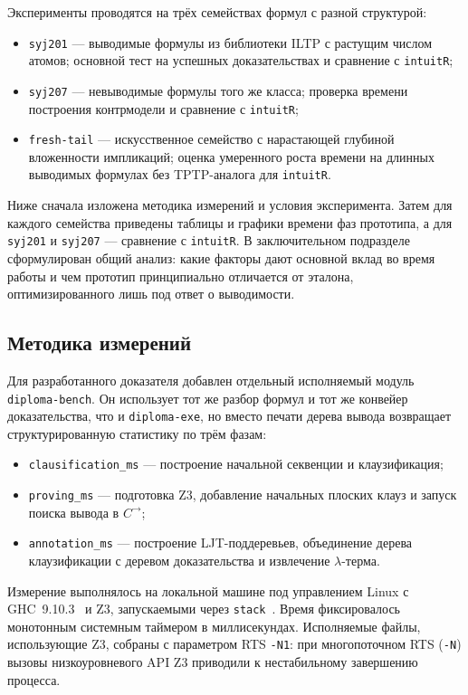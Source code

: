 \documentclass[14pt, russian]{scrartcl}
\begin{document}
Эксперименты проводятся на трёх семействах формул с разной структурой:
\begin{itemize}
\item \texttt{syj201} --- выводимые формулы из библиотеки ILTP с растущим числом
  атомов; основной тест на успешных доказательствах и сравнение с
  \texttt{intuitR};
\item \texttt{syj207} --- невыводимые формулы того же класса; проверка времени
  построения контрмодели и сравнение с \texttt{intuitR};
\item \texttt{fresh-tail} --- искусственное семейство с нарастающей глубиной
  вложенности импликаций; оценка умеренного роста времени на длинных
  выводимых формулах без TPTP-аналога для \texttt{intuitR}.
\end{itemize}

Ниже сначала изложена методика измерений и условия эксперимента. Затем для
каждого семейства приведены таблицы и графики времени фаз прототипа, а для
\texttt{syj201} и \texttt{syj207} --- сравнение с \texttt{intuitR}. В
заключительном подразделе сформулирован общий анализ: какие факторы дают
основной вклад во время работы и чем прототип принципиально отличается от
эталона, оптимизированного лишь под ответ о выводимости.

\subsection{Методика измерений}

Для разработанного доказателя добавлен отдельный исполняемый модуль
\texttt{diploma-bench}. Он использует тот же разбор формул и тот же конвейер
доказательства, что и \texttt{diploma-exe}, но вместо печати дерева вывода
возвращает структурированную статистику по трём фазам:
\begin{itemize}
\item \texttt{clausification\_ms} --- построение начальной секвенции и
  клаузификация;
\item \texttt{proving\_ms} --- подготовка Z3, добавление начальных плоских клауз
  и запуск поиска вывода в $C^{\rightarrow}$;
\item \texttt{annotation\_ms} --- построение LJT-поддеревьев, объединение дерева
  клаузификации с деревом доказательства и извлечение $\lambda$-терма.
\end{itemize}

Измерение выполнялось на локальной машине под управлением Linux с
GHC~9.10.3~\cite{GHCUserGuide} и Z3, запускаемыми через \texttt{stack}~\cite{StackDocs}.
Время фиксировалось монотонным системным таймером в миллисекундах. Исполняемые файлы, использующие Z3, собраны
с параметром RTS \texttt{-N1}: при многопоточном RTS (\texttt{-N}) вызовы
низкоуровневого API Z3 приводили к нестабильному завершению процесса.
\end{document}
